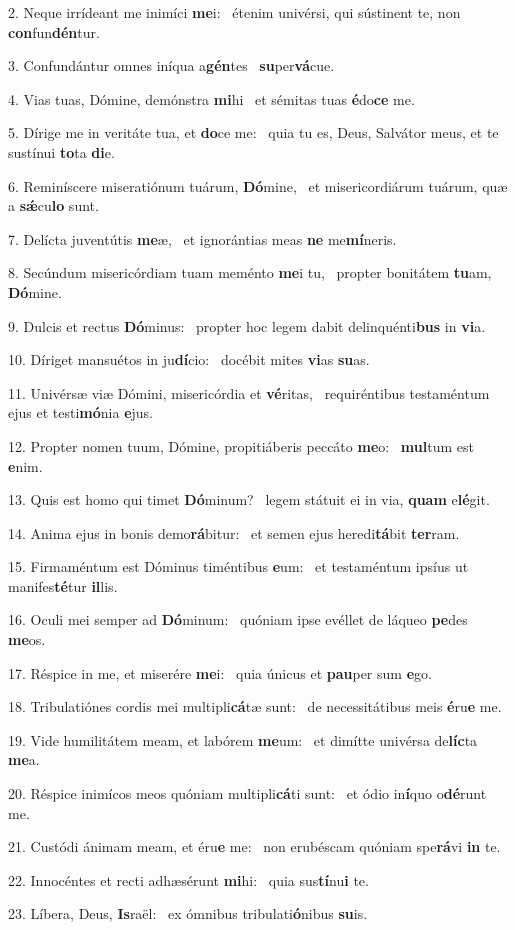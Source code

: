 2. Neque irrídeant me inimíci \textbf{me}i: \ast\  étenim univérsi, qui sústinent te, non \textbf{con}fun\textbf{dén}tur.\

3. Confundántur omnes iníqua a\textbf{gén}tes \ast\  \textbf{su}per\textbf{vá}cue.\

4. Vias tuas, Dómine, demónstra \textbf{mi}hi \ast\  et sémitas tuas \textbf{é}do\textbf{ce} me.\

5. Dírige me in veritáte tua, et \textbf{do}ce me: \ast\  quia tu es, Deus, Salvátor meus, et te sustínui \textbf{to}ta \textbf{di}e.\

6. Reminíscere miseratiónum tuárum, \textbf{Dó}mine, \ast\  et misericordiárum tuárum, quæ a \textbf{sǽ}cu\textbf{lo} sunt.\

7. Delícta juventútis \textbf{me}æ, \ast\  et ignorántias meas \textbf{ne} me\textbf{mí}neris.\

8. Secúndum misericórdiam tuam meménto \textbf{me}i tu, \ast\  propter bonitátem \textbf{tu}am, \textbf{Dó}mine.\

9. Dulcis et rectus \textbf{Dó}minus: \ast\  propter hoc legem dabit delinquénti\textbf{bus} in \textbf{vi}a.\

10. Díriget mansuétos in ju\textbf{dí}cio: \ast\  docébit mites \textbf{vi}as \textbf{su}as.\

11. Univérsæ viæ Dómini, misericórdia et \textbf{vé}ritas, \ast\  requiréntibus testaméntum ejus et testi\textbf{mó}nia \textbf{e}jus.\

12. Propter nomen tuum, Dómine, propitiáberis peccáto \textbf{me}o: \ast\  \textbf{mul}tum est \textbf{e}nim.\

13. Quis est homo qui timet \textbf{Dó}minum? \ast\  legem státuit ei in via, \textbf{quam} e\textbf{lé}git.\

14. Anima ejus in bonis demo\textbf{rá}bitur: \ast\  et semen ejus heredi\textbf{tá}bit \textbf{ter}ram.\

15. Firmaméntum est Dóminus timéntibus \textbf{e}um: \ast\  et testaméntum ipsíus ut manifes\textbf{té}tur \textbf{il}lis.\

16. Oculi mei semper ad \textbf{Dó}minum: \ast\  quóniam ipse evéllet de láqueo \textbf{pe}des \textbf{me}os.\

17. Réspice in me, et miserére \textbf{me}i: \ast\  quia únicus et \textbf{pau}per sum \textbf{e}go.\

18. Tribulatiónes cordis mei multipli\textbf{cá}tæ sunt: \ast\  de necessitátibus meis \textbf{é}ru\textbf{e} me.\

19. Vide humilitátem meam, et labórem \textbf{me}um: \ast\  et dimítte univérsa de\textbf{líc}ta \textbf{me}a.\

20. Réspice inimícos meos quóniam multipli\textbf{cá}ti sunt: \ast\  et ódio in\textbf{í}quo o\textbf{dé}runt me.\

21. Custódi ánimam meam, et éru\textbf{e} me: \ast\  non erubéscam quóniam spe\textbf{rá}vi \textbf{in} te.\

22. Innocéntes et recti adhæsérunt \textbf{mi}hi: \ast\  quia sus\textbf{tí}nu\textbf{i} te.\

23. Líbera, Deus, \textbf{Is}raël: \ast\  ex ómnibus tribulati\textbf{ó}nibus \textbf{su}is.\

